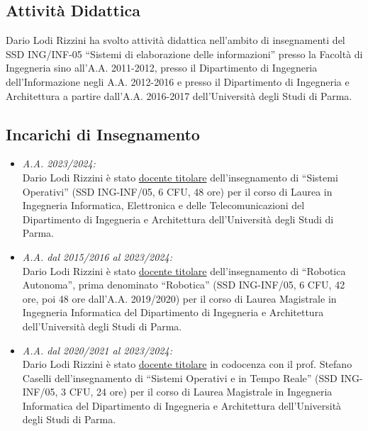 \documentclass[11pt]{article}
\newcommand{\ITEMDATE}[1]{\item \textit{#1:}\\}
\begin{document}
\begin{itemize}



\section{Attivit\`a Didattica}

Dario Lodi Rizzini ha svolto attivit\`a didattica nell'ambito di insegnamenti del 
SSD ING/INF-05 ``Sistemi di elaborazione delle informazioni'' presso la Facolt\`a di Ingegneria 
sino all'A.A. 2011-2012, presso il Dipartimento di Ingegneria dell'Informazione negli A.A. 2012-2016 
e presso il Dipartimento di Ingegneria e Architettura a partire dall'A.A. 2016-2017
dell'Universit\`a degli Studi di Parma. 

\subsection*{Incarichi di Insegnamento}

\begin{itemize}
\ITEMDATE{A.A. 2023/2024}
Dario Lodi Rizzini \`e stato \underline{docente titolare} dell'insegnamento di ``Sistemi Operativi'' (SSD ING-INF/05, 6 CFU, 48 ore) per il corso di Laurea in Ingegneria Informatica, Elettronica e delle Telecomunicazioni del Dipartimento di Ingegneria e Architettura 
dell'Universit\`a degli Studi di Parma. 

\ITEMDATE{A.A. dal 2015/2016 al 2023/2024}
Dario Lodi Rizzini \`e stato \underline{docente titolare} dell'insegnamento di ``Robotica Autonoma'', prima denominato ``Robotica'' (SSD ING-INF/05, 6 CFU, 42 ore, poi 48 ore dall'A.A. 2019/2020)
per il corso di Laurea Magistrale in Ingegneria Informatica del Dipartimento di Ingegneria e Architettura 
dell'Universit\`a degli Studi di Parma. 

\ITEMDATE{A.A. dal 2020/2021 al 2023/2024}
Dario Lodi Rizzini \`e stato \underline{docente titolare} in codocenza con il prof. Stefano Caselli dell'insegnamento di ``Sistemi Operativi e in Tempo Reale'' (SSD ING-INF/05, 3 CFU, 24 ore)
per il corso di Laurea Magistrale in Ingegneria Informatica del Dipartimento di Ingegneria e Architettura 
dell'Universit\`a degli Studi di Parma.


\end{itemize}
\end{itemize}
\end{document}
